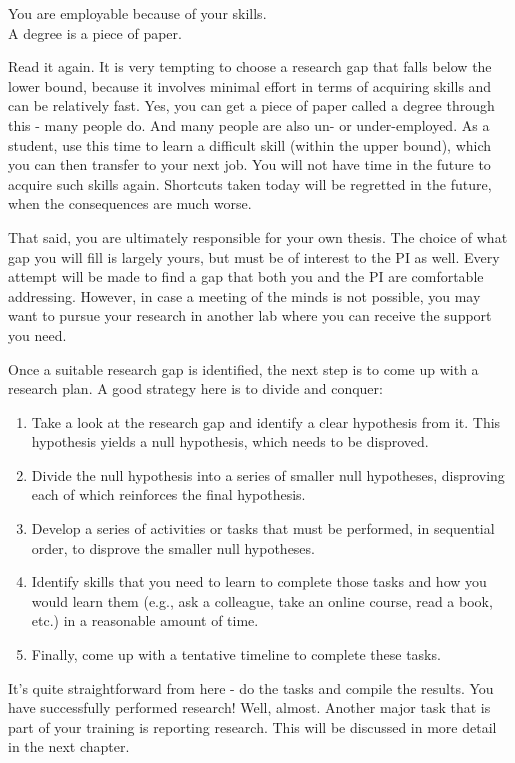 \documentclass[12pt]{article}
\begin{document}
\begin{center}
\large{You are employable because of your skills.\\ A degree is a piece of paper.}
\end{center}

Read it again. It is very tempting to choose a research gap that falls below the lower bound, because it involves minimal effort in terms of acquiring skills and can be relatively fast. Yes, you can get a piece of paper called a degree through this - many people do. And many people are also un- or under-employed. As a student, use this time to learn a difficult skill (within the upper bound), which you can then transfer to your next job. You will not have time in the future to acquire such skills again. Shortcuts taken today will be regretted in the future, when the consequences are much worse. 

That said, you are ultimately responsible for your own thesis. The choice of what gap you will fill is largely yours, but must be of interest to the PI as well. Every attempt will be made to find a gap that both you and the PI are comfortable addressing. However, in case a meeting of the minds is not possible, you may want to pursue your research in another lab where you can receive the support you need. 

Once a suitable research gap is identified, the next step is to come up with a research plan. A good strategy here is to divide and conquer:

\begin{enumerate}
	\item Take a look at the research gap and identify a clear hypothesis from it. This hypothesis yields a null hypothesis, which needs to be disproved.
	\item Divide the null hypothesis into a series of smaller null hypotheses, disproving each of which reinforces the final hypothesis.
	\item Develop a series of activities or tasks that must be performed, in sequential order, to disprove the smaller null hypotheses. 
	\item Identify skills that you need to learn to complete those tasks and how you would learn them (e.g., ask a colleague, take an online course, read a book, etc.) in a reasonable amount of time.
	\item Finally, come up with a tentative timeline to complete these tasks.
\end{enumerate}

It's quite straightforward from here - do the tasks and compile the results. You have successfully performed research! Well, almost. Another major task that is part of your training is reporting research. This will be discussed in more detail in the next chapter.
\end{document}
